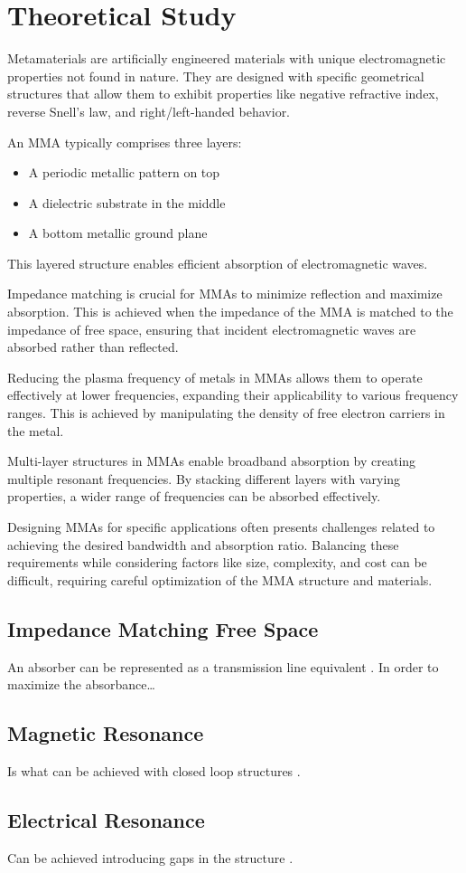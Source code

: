 \section{\textsf{Theoretical Study}}
    Metamaterials are artificially engineered materials with unique electromagnetic properties
    not found in nature. They are designed with specific geometrical structures that allow them
    to exhibit properties like negative refractive index, reverse Snell's law, and right/left-handed
    behavior. 
    
    An MMA typically comprises three layers: 
    \begin{itemize}
        \item A periodic metallic pattern on top
        \item A dielectric substrate in the middle
        \item A bottom metallic ground plane
    \end{itemize}
    This layered structure enables efficient absorption of electromagnetic waves.

    Impedance matching is crucial for MMAs to minimize reflection and maximize absorption. 
    This is achieved when the impedance of the MMA is matched to the impedance of free space,
    ensuring that incident electromagnetic waves are absorbed rather than reflected.
    
    Reducing the plasma frequency of metals in MMAs allows them to operate effectively at 
    lower frequencies, expanding their applicability to various frequency ranges. 
    This is achieved by manipulating the density of free electron carriers in the metal.

    Multi-layer structures in MMAs enable broadband absorption by creating multiple resonant
    frequencies. By stacking different layers with varying properties, a wider range of 
    frequencies can be absorbed effectively.


    Designing MMAs for specific applications often presents challenges related to achieving 
    the desired bandwidth and absorption ratio. Balancing these requirements while considering
    factors like size, complexity, and cost can be difficult, requiring careful optimization
    of the MMA structure and materials.

    \subsection{\textsf{Impedance Matching Free Space}}
        An absorber can be represented as a transmission line equivalent
        \cite{biswas_ultra-wideband_2022}. In order to maximize the absorbance\dots 

    \subsection{\textsf{Magnetic Resonance}}
        Is what can be achieved with closed loop structures \cite{abdulkarim_review_2022}.
    
    \subsection{\textsf{Electrical Resonance}}
        Can be achieved introducing gaps in the structure \cite{abdulkarim_review_2022}.